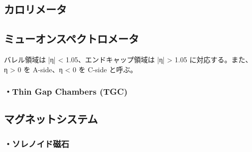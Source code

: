 \subsection{カロリメータ}

\subsection{ミューオンスペクトロメータ}
\label{section2-2-4}
バレル領域は |η| < 1.05、エンドキャップ領域は |η| > 1.05
に対応する。また、η > 0 を A-side、η < 0 を C-side と呼ぶ。


\subsubsection{・Thin Gap Chambers (TGC)}



\subsection{マグネットシステム}
\subsubsection{・ソレノイド磁石}




